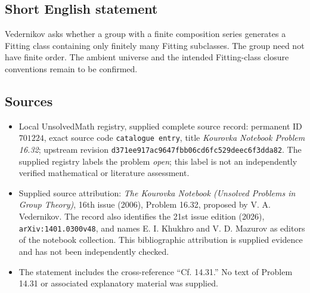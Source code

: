 \documentclass[11pt]{article}
\begin{document}
\subsection{Short English statement}
Vedernikov asks whether a group with a finite composition series generates a Fitting class containing only finitely many Fitting subclasses. The group need not have finite order. The ambient universe and the intended Fitting-class closure conventions remain to be confirmed.
\subsection{Sources}
\begin{itemize}
\item Local UnsolvedMath registry, supplied complete source record: permanent ID \(701224\), exact source code \texttt{catalogue entry}, title \emph{Kourovka Notebook Problem 16.32}; upstream revision \texttt{d371ee917ac9647fbb06cd6fc529deec6f3dda82}. The supplied registry labels the problem \emph{open}; this label is not an independently verified mathematical or literature assessment.
\item Supplied source attribution: \emph{The Kourovka Notebook (Unsolved Problems in Group Theory)}, 16th issue (2006), Problem 16.32, proposed by V. A. Vedernikov. The record also identifies the 21st issue edition (2026), \texttt{arXiv:1401.0300v48}, and names E. I. Khukhro and V. D. Mazurov as editors of the notebook collection. This bibliographic attribution is supplied evidence and has not been independently checked.
\item The statement includes the cross-reference ``Cf. 14.31.'' No text of Problem 14.31 or associated explanatory material was supplied.
\end{itemize}
\end{document}
